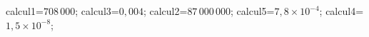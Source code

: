 \documentclass[exercice]{thedocument}%
\begin{document}
%
    \>calcul1=$708\,000$;%
    \>calcul3=$0,004$;%
    \>calcul2=$87\,000\,000$;%
    \>calcul5=$7,8\times10^{-4}$;%
    \>calcul4=$1,5\times10^{-8}$;%
\end{document}
